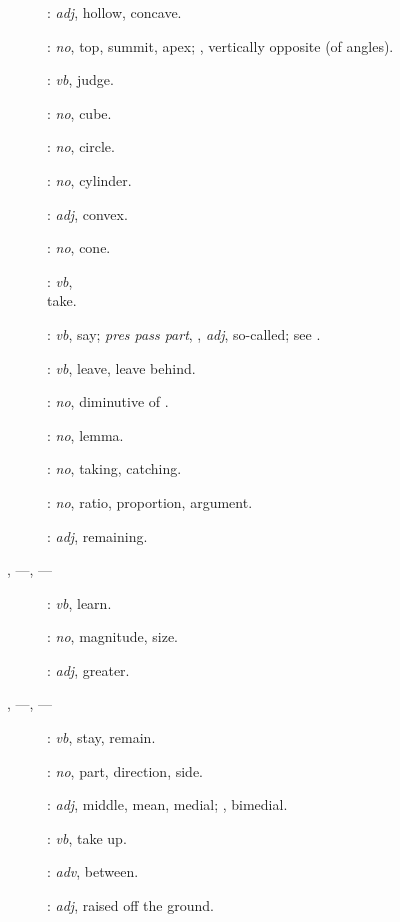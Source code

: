 {\begin{description}
\item[]: {\em adj}, hollow, concave.
\item[]: {\em no}, top, summit, apex; ,
vertically opposite (of angles).
\item[]:
{\em vb}, judge.
\item[]: {\em no}, cube.
\item[]: {\em no}, circle.
\item[]: {\em no}, cylinder.
\item[]: {\em adj}, convex.
\item[]: {\em no}, cone.
\item[]:
{\em vb},\\ take. 
\item[]: {\em vb}, say; {\em pres pass part},
, {\em adj}, so-called; see .
\item[]: {\em vb}, leave, leave behind.
\item[]: {\em no}, diminutive of .
\item[]: {\em no}, lemma.
\item[]: {\em no}, taking, catching.
\item[]: {\em no}, ratio, proportion, argument.
\item[]: {\em adj}, remaining.
\item[, ---, ---]:  {\em vb}, learn.
\item[]: {\em no}, magnitude, size.
\item[]: {\em adj}, greater.
\item[, ---, ---]: {\em vb}, stay,
remain.
\item[]: {\em no}, part, direction, side.
\item[]: {\em adj}, middle, mean, medial; , bimedial.
\item[]: {\em vb}, take up.
\item[]: {\em adv}, between.
\item[]: {\em adj}, raised off the ground.

\end{description}}
